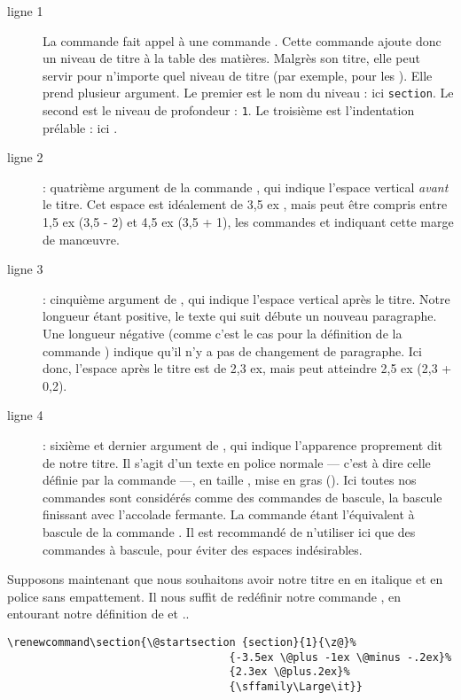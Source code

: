 \begin{description}
\item[ligne 1]La commande  fait appel à une commande \commande{\@startsection}. Cette commande ajoute donc un niveau de titre à la table des matières. Malgrès son titre, elle peut servir pour n'importe quel niveau de titre (par exemple, pour les ). Elle prend plusieur argument. Le premier est le nom du niveau : ici \verb|section|. Le second est le niveau de profondeur : \verb|1|. Le troisième est l'indentation prélable : ici .
\item[ligne 2]: quatrième argument de la commande , qui indique l'espace vertical \emph{avant} le titre. Cet espace est idéalement de 3,5 ex , mais peut être compris entre 1,5 ex (3,5 - 2) et 4,5 ex (3,5 + 1), les commandes  et  indiquant cette marge de manœuvre.
\item[ligne 3]: cinquième argument de , qui indique l'espace vertical après le titre. Notre longueur étant positive, le texte qui suit débute un nouveau paragraphe. Une longueur négative (comme c'est le cas pour la définition de la commande ) indique qu'il n'y a pas de changement de paragraphe. Ici donc, l'espace après le titre est de 2,3 ex, mais peut atteindre 2,5 ex (2,3 + 0,2).
\item[ligne 4]: sixième et dernier argument de , qui indique l'apparence proprement dit de notre titre. Il s'agit d'un texte en police normale --- c'est à dire celle définie par la commande  ---, en taille , mise en gras (\commande{\bfseries}). Ici toutes nos commandes sont considérés comme des commandes de bascule, la bascule finissant avec l'accolade fermante. La commande  étant l'équivalent à bascule de la commande . Il est recommandé de n'utiliser ici que des commandes à bascule, pour éviter des espaces indésirables. 
\end{description}

Supposons maintenant que nous souhaitons avoir notre titre en en italique et en police sans empattement. Il nous suffit de redéfinir notre commande , en entourant notre définition de  et ..

\begin{verbatim}
\renewcommand\section{\@startsection {section}{1}{\z@}%
                                   {-3.5ex \@plus -1ex \@minus -.2ex}%
                                   {2.3ex \@plus.2ex}%
                                   {\sffamily\Large\it}}
\end{verbatim}

